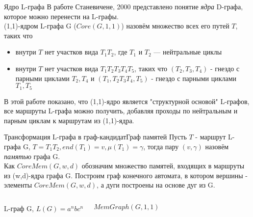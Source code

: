 \documentclass{beamer}
\begin{document}
\begin{frame}{Ядро L-графа}
В работе Станевичене, 2000 представлено понятие \textit{ядра} D-графа, которое можно перенести на L-графы.\\
\vspace{0.3cm}
(1,1)-ядром L-графа G ($Core(G,1,1)$) назовём множество всех его путей $T$, таких что
\begin{itemize}
  \item внутри $T$ нет участков вида $T_1T_2$, где $T_1 \text{ и } T_2$ --- нейтральные циклы
  \item внутри $T$ нет участков вида $T_1T_2T_3T_4T_5$, таких что $(T_2,T_3,T_4)$ - гнездо с парными циклами $T_2,T_4$ и $(T_1,T_2T_3T_4,T_5)$ - гнездо с парными циклами $T_1,T_5$
\end{itemize}

В этой работе показано, что (1,1)-ядро является "структурной основой"  L-графов, все маршруты L-графа можно получить, добавляя проходы по нейтральным и парным циклам к маршрутам из (1,1)-ядра.
\end{frame}

\begin{frame}{Трансформация L-графа в граф-кандидат}{Граф памятей}
Пусть $T$ - маршрут L-графа G, $T=T_1T_2, end(T_1) = v,\allowbreak \mu(T_1) = \gamma$, тогда пару $(v,\gamma)$ назовём \textit{памятью} графа G.\\
Как $CoreMem(G,w,d)$ обозначим множество памятей, входящих в маршруты из (w,d)-ядра графа G.
Построим граф конечного автомата, в котором вершины - элементы $CoreMem(G,w,d)$, а дуги построены на основе дуг из G.
\begin{columns}
    L-граф G, $L(G) = a^nbc^n$
    $MemGraph(G,1,1)$
  \end{columns}
\end{frame}
\end{document}
